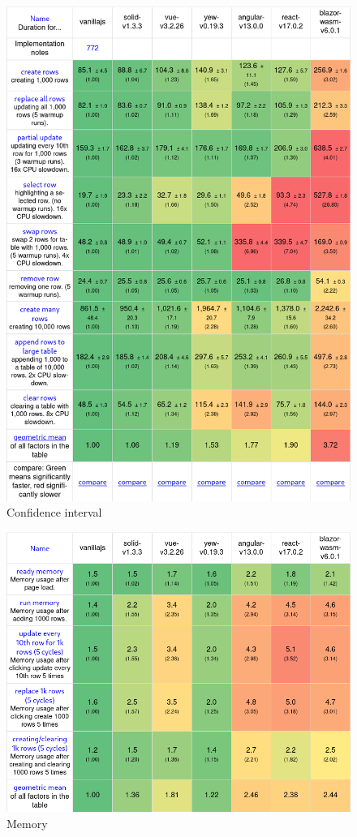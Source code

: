 \begin{figure}[h]
  \begin{center}
    \includegraphics[width=\textwidth]{figures/benchmarks/confidence_interval.png}
  \end{center}
  \caption{Confidence interval}
  \label{fig:bench_confidence}
\end{figure}

\begin{figure}[h]
  \begin{center}
    \includegraphics[width=\textwidth]{figures/benchmarks/memory.png}
  \end{center}
  \caption{Memory}
  \label{fig:bench_memory}
\end{figure}
